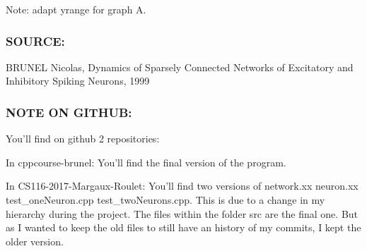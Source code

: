 Note\-: adapt yrange for graph A.

\subsubsection*{S\-O\-U\-R\-C\-E\-:}

B\-R\-U\-N\-E\-L Nicolas, Dynamics of Sparsely Connected Networks of Excitatory and Inhibitory Spiking Neurons, 1999

\subsubsection*{N\-O\-T\-E O\-N G\-I\-T\-H\-U\-B\-:}

You'll find on github 2 repositories\-:

In cppcourse-\/brunel\-: You'll find the final version of the program.

In C\-S116-\/2017-\/\-Margaux-\/\-Roulet\-: You'll find two versions of network.\-xx neuron.\-xx test\-\_\-one\-Neuron.\-cpp test\-\_\-two\-Neurons.\-cpp. This is due to a change in my hierarchy during the project. The files within the folder src are the final one. But as I wanted to keep the old files to still have an history of my commits, I kept the older version. 
